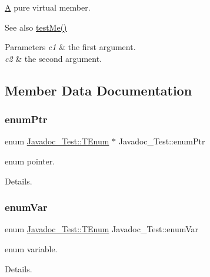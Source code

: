 \mbox{\hyperlink{class_a}{A}} pure virtual member. 

\begin{DoxySeeAlso}{See also}
\mbox{\hyperlink{class_javadoc___test_a0c472683ed25ff096e8a9edfb18d550c}{test\+Me()}} 
\end{DoxySeeAlso}

\begin{DoxyParams}{Parameters}
{\em c1} & the first argument. \\
\hline
{\em c2} & the second argument. \\
\hline
\end{DoxyParams}


\subsection{Member Data Documentation}
\mbox{\label{class_javadoc___test_abcb36df9d8af3e69290c239ba483d6df}} 
\subsubsection{\texorpdfstring{enumPtr}{enumPtr}}
{\footnotesize\ttfamily enum \mbox{\hyperlink{class_javadoc___test_ae37fd1cbf1af522674cbd33873b786a6}{Javadoc\+\_\+\+Test\+::\+T\+Enum}} 
       $\ast$ Javadoc\+\_\+\+Test\+::enum\+Ptr}



enum pointer. 

Details. \mbox{\label{class_javadoc___test_a689558649150237b53a5c8ed89c996c2}} 
\subsubsection{\texorpdfstring{enumVar}{enumVar}}
{\footnotesize\ttfamily enum \mbox{\hyperlink{class_javadoc___test_ae37fd1cbf1af522674cbd33873b786a6}{Javadoc\+\_\+\+Test\+::\+T\+Enum}}
        Javadoc\+\_\+\+Test\+::enum\+Var}



enum variable. 

Details. \mbox{\label{class_javadoc___test_ace81a523a4eef44501a841a6d338832b}} 
